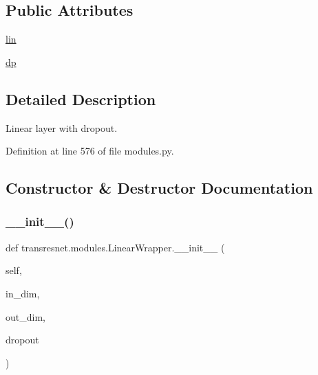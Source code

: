 \subsection*{Public Attributes}
\begin{DoxyCompactItemize}
\item 
\hyperlink{classtransresnet_1_1modules_1_1LinearWrapper_a499218599133063e99a71113b4a8b440}{lin}
\item 
\hyperlink{classtransresnet_1_1modules_1_1LinearWrapper_aef8b1be67f1b1a02f4e4004c83f680f7}{dp}
\end{DoxyCompactItemize}


\subsection{Detailed Description}
\begin{DoxyVerb}Linear layer with dropout.\end{DoxyVerb}
 

Definition at line 576 of file modules.\+py.



\subsection{Constructor \& Destructor Documentation}
\mbox{\label{classtransresnet_1_1modules_1_1LinearWrapper_aed7acb4e51cc10c1898a6100c020b74b}} 
\subsubsection{\texorpdfstring{\+\_\+\+\_\+init\+\_\+\+\_\+()}{\_\_init\_\_()}}
{\footnotesize\ttfamily def transresnet.\+modules.\+Linear\+Wrapper.\+\_\+\+\_\+init\+\_\+\+\_\+ (\begin{DoxyParamCaption}\item[{}]{self,  }\item[{}]{in\+\_\+dim,  }\item[{}]{out\+\_\+dim,  }\item[{}]{dropout }\end{DoxyParamCaption})}




